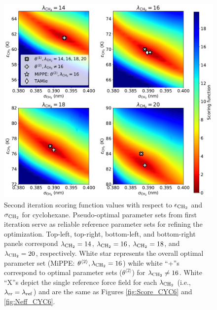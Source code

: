 \documentclass[journal=jced,manuscript=article]{achemso}
\begin{document}
	\begin{figure}[htb!]
		\centering
		\includegraphics[width=6.4in]{CYC6_scoring_function_lam_iteration.pdf}
		\caption{Second iteration scoring function values with respect to $\epsilon_{\rm CH_2}$ and $\sigma_{\rm CH_2}$ for cyclohexane. Pseudo-optimal parameter sets from first iteration serve as reliable reference parameter sets for refining the optimization. Top-left, top-right, bottom-left, and bottom-right panels correspond $\lambda_{\rm CH_2} = 14$, $\lambda_{\rm CH_2} = 16$, $\lambda_{\rm CH_2} = 18$, and $\lambda_{\rm CH_2} = 20$, respectively. White star represents the overall optimal parameter set (MiPPE: $\theta^{\langle2\rangle}, \lambda_{\rm CH_2} = 16$) while white ``+''s correspond to optimal parameter sets ($\theta^{\langle2\rangle}$) for $\lambda_{\rm CH_2} \neq 16$. White ``X''s depict the single reference force field for each $\lambda_{\rm CH_2}$ (i.e., $\lambda_{\rm rr} = \lambda_{\rm ref}$) and are the same as Figures \ref{fig:Score_CYC6} and \ref{fig:Neff_CYC6}.} %
		\label{fig:Iterate_Score_CYC6}
	\end{figure} 

\end{document}
